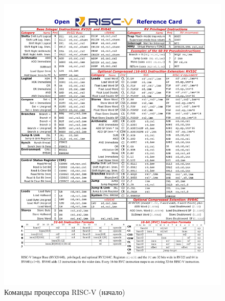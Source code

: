 \begin{figure}[htbp]
    \centering
    \includegraphics[width=1.0\textwidth]{img/riscv-reference-card-01.png}
    \caption{Команды процессора RISC-V (начало)}
    \label{ref-riscv-commands-01}
\end{figure}

